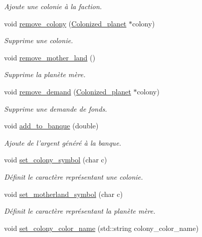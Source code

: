 \begin{DoxyCompactItemize}
\begin{DoxyCompactList}\small\item\em Ajoute une colonie à la faction. \end{DoxyCompactList}\item 
void \hyperlink{classFaction_a0806d816ec82da48403a87a515e9ad0a}{remove\-\_\-colony} (\hyperlink{classColonized__planet}{Colonized\-\_\-planet} $\ast$colony)
\begin{DoxyCompactList}\small\item\em Supprime une colonie. \end{DoxyCompactList}\item 
void \hyperlink{classFaction_a5c704bccee1f3c845b3b521429bc4e60}{remove\-\_\-mother\-\_\-land} ()
\begin{DoxyCompactList}\small\item\em Supprime la planète mère. \end{DoxyCompactList}\item 
void \hyperlink{classFaction_ae90c4eab208071323dbc6c0991a22051}{remove\-\_\-demand} (\hyperlink{classColonized__planet}{Colonized\-\_\-planet} $\ast$colony)
\begin{DoxyCompactList}\small\item\em Supprime une demande de fonds. \end{DoxyCompactList}\item 
void \hyperlink{classFaction_ab550ddb4adcb6d480e4004915e7f20ce}{add\-\_\-to\-\_\-banque} (double)
\begin{DoxyCompactList}\small\item\em Ajoute de l'argent généré à la banque. \end{DoxyCompactList}\item 
\hypertarget{classFaction_a07b25ba27c0c8d158cb2310d064cc8a4}{void \hyperlink{classFaction_a07b25ba27c0c8d158cb2310d064cc8a4}{set\-\_\-colony\-\_\-symbol} (char c)}\label{classFaction_a07b25ba27c0c8d158cb2310d064cc8a4}

\begin{DoxyCompactList}\small\item\em Définit le caractère représentant une colonie. \end{DoxyCompactList}\item 
\hypertarget{classFaction_a9c1d1b8ab782174bf113ad7183cfe0c3}{void \hyperlink{classFaction_a9c1d1b8ab782174bf113ad7183cfe0c3}{set\-\_\-motherland\-\_\-symbol} (char c)}\label{classFaction_a9c1d1b8ab782174bf113ad7183cfe0c3}

\begin{DoxyCompactList}\small\item\em Définit le caractère représentant la planète mère. \end{DoxyCompactList}\item 
\hypertarget{classFaction_a51eadaa457179270f1950ed84e44df56}{void \hyperlink{classFaction_a51eadaa457179270f1950ed84e44df56}{set\-\_\-colony\-\_\-color\-\_\-name} (std\-::string colony\-\_\-color\-\_\-name)}\label{classFaction_a51eadaa457179270f1950ed84e44df56}


\end{DoxyCompactItemize}
